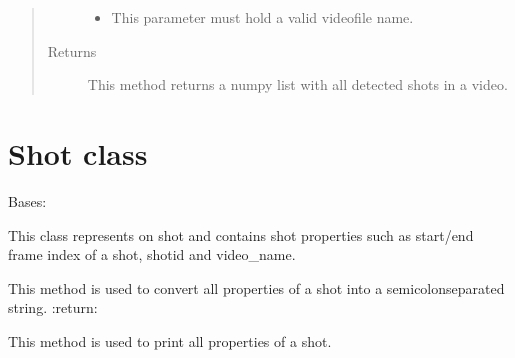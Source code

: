 \documentclass[letterpaper,10pt,english,openany,oneside]{sphinxmanual}
\begin{document}
\begin{fulllineitems}
\begin{fulllineitems}
\begin{quote}
\begin{description}
\begin{itemize}
\item {} 
 \textendash{} This parameter must hold a valid videofile name.

\end{itemize}

\item[{Returns}] \leavevmode
This method returns a numpy list with all detected shots in a video.

\end{description}\end{quote}

\end{fulllineitems}


\end{fulllineitems}



\section{Shot class}
\label{\detokenize{Shot:shot-class}}\label{\detokenize{Shot::doc}}

\begin{fulllineitems}
\label{\detokenize{Shot:sbd.Shot.Shot}}
Bases: 

This class represents on shot and contains shot properties such as start/end frame index of a shot, shot\sphinxhyphen{}id and
video\_name.

\begin{fulllineitems}
\label{\detokenize{Shot:sbd.Shot.Shot.convert2String}}
This method is used to convert all properties of a shot into a semicolon\sphinxhyphen{}separated string.
:return:

\end{fulllineitems}


\begin{fulllineitems}
\label{\detokenize{Shot:sbd.Shot.Shot.printShotInfo}}
This method is used to print all properties of a shot.

\end{fulllineitems}


\end{fulllineitems}
\end{document}
